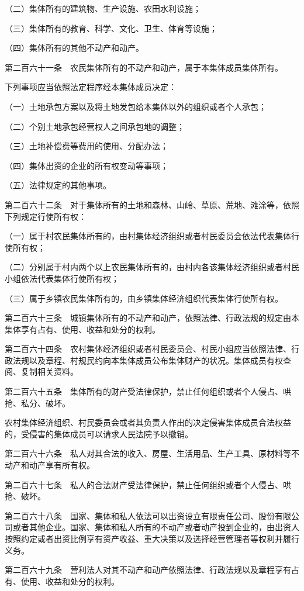 \documentclass[UTF8,12pt,a4paper]{ctexbook}
\begin{document}
（二）集体所有的建筑物、生产设施、农田水利设施；

（三）集体所有的教育、科学、文化、卫生、体育等设施；

（四）集体所有的其他不动产和动产。

第二百六十一条　农民集体所有的不动产和动产，属于本集体成员集体所有。

下列事项应当依照法定程序经本集体成员决定：

（一）土地承包方案以及将土地发包给本集体以外的组织或者个人承包；

（二）个别土地承包经营权人之间承包地的调整；

（三）土地补偿费等费用的使用、分配办法；

（四）集体出资的企业的所有权变动等事项；

（五）法律规定的其他事项。

第二百六十二条　对于集体所有的土地和森林、山岭、草原、荒地、滩涂等，依照下列规定行使所有权：

（一）属于村农民集体所有的，由村集体经济组织或者村民委员会依法代表集体行使所有权；

（二）分别属于村内两个以上农民集体所有的，由村内各该集体经济组织或者村民小组依法代表集体行使所有权；

（三）属于乡镇农民集体所有的，由乡镇集体经济组织代表集体行使所有权。

第二百六十三条　城镇集体所有的不动产和动产，依照法律、行政法规的规定由本集体享有占有、使用、收益和处分的权利。

第二百六十四条　农村集体经济组织或者村民委员会、村民小组应当依照法律、行政法规以及章程、村规民约向本集体成员公布集体财产的状况。集体成员有权查阅、复制相关资料。

第二百六十五条　集体所有的财产受法律保护，禁止任何组织或者个人侵占、哄抢、私分、破坏。

农村集体经济组织、村民委员会或者其负责人作出的决定侵害集体成员合法权益的，受侵害的集体成员可以请求人民法院予以撤销。

第二百六十六条　私人对其合法的收入、房屋、生活用品、生产工具、原材料等不动产和动产享有所有权。

第二百六十七条　私人的合法财产受法律保护，禁止任何组织或者个人侵占、哄抢、破坏。

第二百六十八条　国家、集体和私人依法可以出资设立有限责任公司、股份有限公司或者其他企业。国家、集体和私人所有的不动产或者动产投到企业的，由出资人按照约定或者出资比例享有资产收益、重大决策以及选择经营管理者等权利并履行义务。

第二百六十九条　营利法人对其不动产和动产依照法律、行政法规以及章程享有占有、使用、收益和处分的权利。
\end{document}
